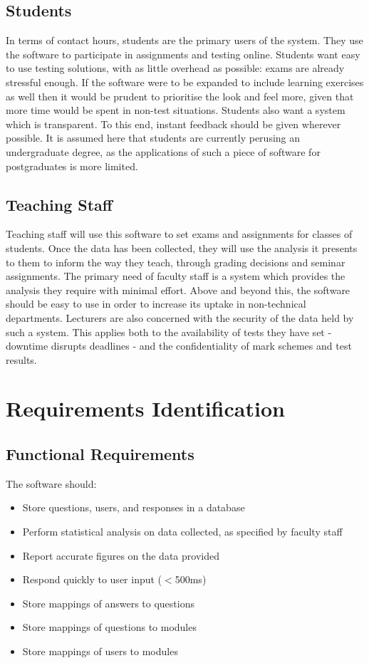 \documentclass[12pt,a4paper,twoside]{report}
\begin{document}
\subsection{Students}
In terms of contact hours, students are the primary users of the system. They use the software to participate in assignments and testing online. Students want easy to use testing solutions, with as little overhead as possible: exams are already stressful enough. If the software were to be expanded to include learning exercises as well then it would be prudent to prioritise the look and feel more, given that more time would be spent in non-test situations. Students also want a system which is transparent. To this end, instant feedback should be given wherever possible. It is assumed here that students are currently perusing an undergraduate degree, as the applications of such a piece of software for postgraduates is more limited.

\subsection{Teaching Staff}
Teaching staff will use this software to set exams and assignments for classes of students. Once the data has been collected, they will use the analysis it presents to them to inform the way they teach, through grading decisions and seminar assignments. The primary need of faculty staff is a system which provides the analysis they require with minimal effort. Above and beyond this, the software should be easy to use in order to increase its uptake in non-technical departments. Lecturers are also concerned with the security of the data held by such a system. This applies both to the availability of tests they have set - downtime disrupts deadlines - and the confidentiality of mark schemes and test results.

\section{Requirements Identification}
\subsection{Functional Requirements}
The software should:
\begin{itemize}
	\item Store questions, users, and responses in a database
	\item Perform statistical analysis on data collected, as specified by faculty staff
	\item Report accurate figures on the data provided
	\item Respond quickly to user input ($<$500ms)
	\item Store mappings of answers to questions
	\item Store mappings of questions to modules
	\item Store mappings of users to modules
\end{itemize}
\end{document}

